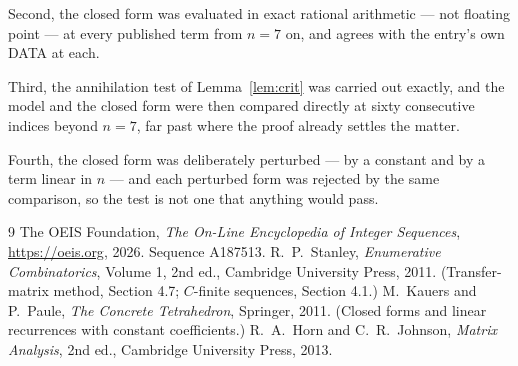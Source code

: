 \documentclass[11pt,a4paper]{article}
\theoremstyle{plain}
\theoremstyle{definition}
\begin{document}
Second, the closed form was evaluated in exact rational arithmetic --- not floating point ---
at every published term from $n=7$ on, and agrees with the entry's own DATA at each.

Third, the annihilation test of Lemma~\ref{lem:crit} was carried out exactly, and the model
and the closed form were then compared directly at sixty consecutive indices beyond
$n=7$, far past where the proof already settles the matter.

Fourth, the closed form was deliberately perturbed --- by a constant and by a term linear in
$n$ --- and each perturbed form was rejected by the same comparison, so the test is not one
that anything would pass.

\begin{thebibliography}{9}
 The OEIS Foundation, \emph{The On-Line Encyclopedia of Integer
Sequences}, \url{https://oeis.org}, 2026. Sequence A187513.
 R.~P.~Stanley, \emph{Enumerative Combinatorics}, Volume 1, 2nd ed.,
Cambridge University Press, 2011. (Transfer-matrix method, Section 4.7; $C$-finite sequences,
Section 4.1.)
 M.~Kauers and P.~Paule, \emph{The Concrete Tetrahedron}, Springer, 2011.
(Closed forms and linear recurrences with constant coefficients.)
 R.~A.~Horn and C.~R.~Johnson, \emph{Matrix Analysis}, 2nd ed., Cambridge
University Press, 2013.
\end{thebibliography}
\end{document}
